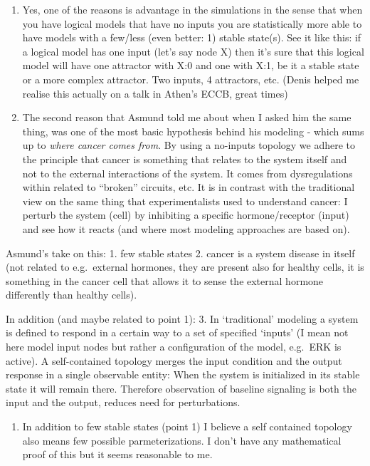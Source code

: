 \documentclass[
  12pt,
]{book}
\providecommand{\tightlist}{%
  \setlength{\itemsep}{0pt}\setlength{\parskip}{0pt}}
\begin{document}
\begin{enumerate}
\def\labelenumi{\arabic{enumi}.}
\tightlist
\item
  Yes, one of the reasons is advantage in the simulations in the sense that when you have logical models that have no inputs you are statistically more able to have models with a few/less (even better: 1) stable state(s).
  See it like this: if a logical model has one input (let's say node X) then it's sure that this logical model will have one attractor with X:0 and one with X:1, be it a stable state or a more complex attractor.
  Two inputs, 4 attractors, etc. (Denis helped me realise this actually on a talk in Athen's ECCB, great times)
\item
  The second reason that Asmund told me about when I asked him the same thing, was one of the most basic hypothesis behind his modeling - which sums up to \emph{where cancer comes from}.
  By using a no-inputs topology we adhere to the principle that cancer is something that relates to the system itself and not to the external interactions of the system.
  It comes from dysregulations within related to ``broken'' circuits, etc.
  It is in contrast with the traditional view on the same thing that experimentalists used to understand cancer: I perturb the system (cell) by inhibiting a specific hormone/receptor (input) and see how it reacts (and where most modeling approaches are based on).
\end{enumerate}

Asmund's take on this:
1. few stable states
2. cancer is a system disease in itself (not related to e.g.~external hormones, they are present also for healthy cells, it is something in the cancer cell that allows it to sense the external hormone differently than healthy cells).

In addition (and maybe related to point 1):
3. In `traditional' modeling a system is defined to respond in a certain way to a set of specified `inputs' (I mean not here model input nodes but rather a configuration of the model, e.g.~ERK is active).
A self-contained topology merges the input condition and the output response in a single observable entity: When the system is initialized in its stable state it will remain there.
Therefore observation of baseline signaling is both the input and the output, reduces need for perturbations.

\begin{enumerate}
\def\labelenumi{\arabic{enumi}.}
\setcounter{enumi}{3}
\tightlist
\item
  In addition to few stable states (point 1) I believe a self contained topology also means few possible parmeterizations.
  I don't have any mathematical proof of this but it seems reasonable to me.
\end{enumerate}
\end{document}

